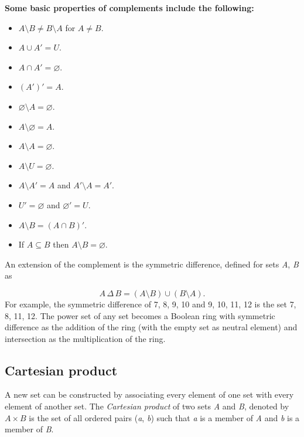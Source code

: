 \textbf{Some basic properties of complements include the following:}



\begin{itemize}
    \item $A \setminus B \neq B \setminus A$ for $A \neq B.$
    \item $A \cup A' = U.$
    \item $A \cap A' = \varnothing.$
    \item $(A')' = A.$
    \item $\varnothing \setminus A = \varnothing.$
    \item $A \setminus \varnothing = A.$
    \item $A \setminus A = \varnothing.$
    \item $A \setminus U = \varnothing.$
    \item $A \setminus A' = A$ and $A' \setminus A = A'.$
    \item $U' = \varnothing$ and $\varnothing' = U.$
    \item $A \setminus B = (A \cap B)'.$
    \item If $A \subseteq B$ then $A \setminus B = \varnothing.$
\end{itemize}

An extension of the complement is the symmetric difference, defined for sets \textit{A},
\textit{B} as



$$A\,\Delta\,B = (A \setminus B) \cup (B \setminus A).$$ For example, the symmetric
difference of {7, 8, 9, 10} and {9, 10, 11, 12} is the set {7, 8, 11, 12}. The power set
of any set becomes a Boolean ring with symmetric difference as the addition of the ring
(with the empty set as neutral element) and intersection as the multiplication of the
ring.




\subsection{Cartesian product}
\label{sss:cart-f675}




A new set can be constructed by associating every element of one set with every element of
another set. The \textit{Cartesian product} of two sets \textit{A} and \textit{B}, denoted
by $A \times B$ is the set of all ordered pairs (\textit{a}, \textit{b}) such
that \textit{a} is a member of \textit{A} and \textit{b} is a member of \textit{B}.



